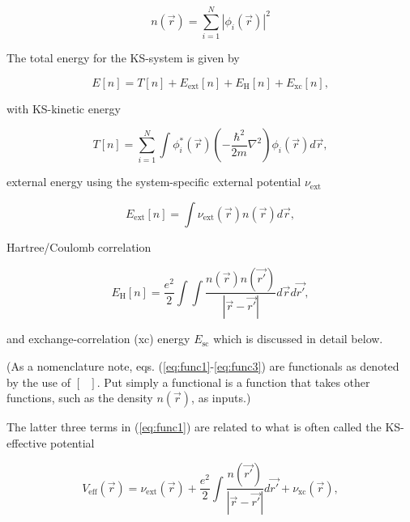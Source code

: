         \begin{equation}
            n(\Vec{r}) = \sum\limits_{i=1}^N |\phi_i(\Vec{r}) |^2
        \end{equation}
        
        The total energy for the KS-system is given by
        
        \begin{equation}
        \label{eq:func1}
            E[n] = T[n] + E_\text{ext}[n] + E_\text{H}[n] + E_\text{xc}[n],
        \end{equation}
        
        \noindent with KS-kinetic energy
        
        \begin{equation}
        \label{eq:func2}
            T[n] = \sum\limits_{i=1}^N \int \phi_i^*(\Vec{r})\left(-\frac{\hbar^2}{2m}\nabla^2 \right)\phi_i(\Vec{r})d\Vec{r},
        \end{equation}
        
        \noindent external energy using the system-specific external potential $\nu_\text{ext}$
        
        \begin{equation}
            E_\text{ext}[n] = \int \nu_\text{ext}(\Vec{r}) n(\Vec{r})d\Vec{r},
        \end{equation}
        
        \noindent Hartree/Coulomb correlation 
        
        \begin{equation}
        \label{eq:func3}
            E_\text{H}[n] = \frac{e^2}{2}\int\int \frac{n(\Vec{r})n(\Vec{r'})}{|\Vec{r} - \Vec{r'}|}d\Vec{r}d\Vec{r'}, 
        \end{equation}
        
        \noindent and exchange-correlation (xc) energy $E_\text{sc}$ which is discussed in detail below. 
        
        (As a nomenclature note, eqs. (\ref{eq:func1}-\ref{eq:func3}) are functionals as denoted by the use of $[\text{ }]$. Put simply a functional is a function that takes other functions, such as the density $n(\Vec{r})$, as inputs.)
        
        The latter three terms in (\ref{eq:func1}) are related to what is often called the KS-effective potential
        
        \begin{equation}
            V_\text{eff}(\Vec{r}) = \nu_\text{ext}(\Vec{r}) + \frac{e^2}{2}\int \frac{n(\Vec{r'})}{|\Vec{r}- \Vec{r'}|} d\Vec{r'} + \nu_\text{xc}(\Vec{r}),
        \end{equation}
        
